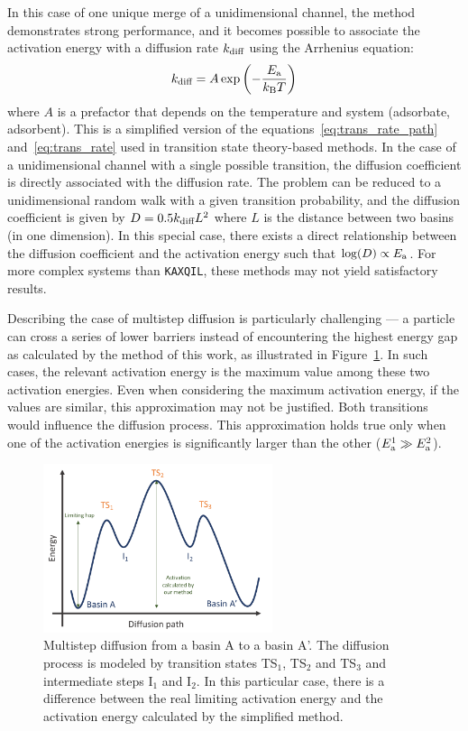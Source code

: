 \documentclass[main]{subfiles}
\begin{document}
In this case of one unique merge of a unidimensional channel, the method demonstrates strong performance, and it becomes possible to associate the activation energy with a diffusion rate $k_{\text{diff}}$ using the Arrhenius equation:
\begin{equation}
  k_{\text{diff}} = A \exp\left(-\frac{E_{\text{a}}}{k_{\text{B}}T}\right)
\end{equation}
where $A$ is a prefactor that depends on the temperature and system (adsorbate, adsorbent). This is a simplified version of the equations~\ref{eq:trans_rate_path} and~\ref{eq:trans_rate} used in transition state theory-based methods. In the case of a unidimensional channel with a single possible transition, the diffusion coefficient is directly associated with the diffusion rate. The problem can be reduced to a unidimensional random walk with a given transition probability, and the diffusion coefficient is given by $D=0.5k_{\text{diff}}L^2$ where $L$ is the distance between two basins (in one dimension). In this special case, there exists a direct relationship between the diffusion coefficient and the activation energy such that $\log(D)\propto E_{\text{a}}$. For more complex systems than \texttt{KAXQIL}, these methods may not yield satisfactory results. 

Describing the case of multistep diffusion is particularly challenging --- a particle can cross a series of lower barriers instead of encountering the highest energy gap as calculated by the method of this work, as illustrated in Figure~\ref{fgr:TS_problem}. In such cases, the relevant activation energy is the maximum value among these two activation energies. Even when considering the maximum activation energy, if the values are similar, this approximation may not be justified. Both transitions would influence the diffusion process. This approximation holds true only when one of the activation energies is significantly larger than the other ($E_{\text{a}}^1 \gg E_{\text{a}}^2$).

\begin{figure}[ht]
  \centering
    \includegraphics[width=0.6\textwidth]{figures/5-diffusion/Diffusion_TS.pdf}
    \caption{Multistep diffusion from a basin A to a basin A'. The diffusion process is modeled by transition states TS$_1$, TS$_2$ and TS$_3$ and intermediate steps I$_1$ and I$_2$. In this particular case, there is a difference between the real limiting activation energy and the activation energy calculated by the simplified method. }\label{fgr:TS_problem}
\end{figure}
\end{document}
